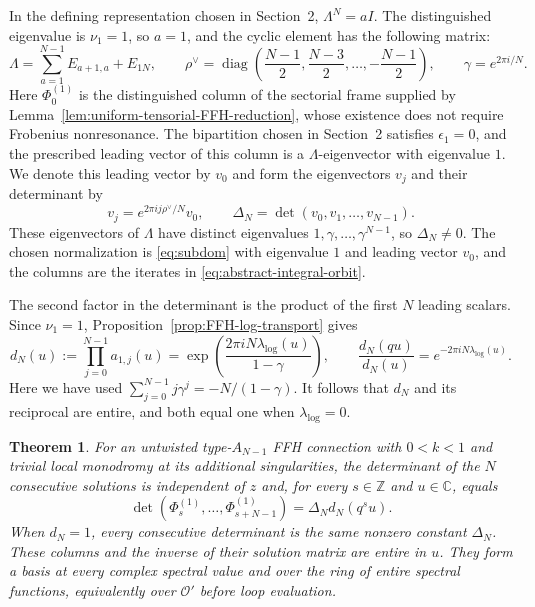 \documentclass[11pt,leqno]{amsart}
\numberwithin{equation}{section}
\theoremstyle{plain}
\newtheorem{theorem}{Theorem}[section]
\theoremstyle{definition}
\theoremstyle{plain}
\theoremstyle{definition}
\theoremstyle{remark}
\begin{document}
In the defining representation chosen in Section~2, $\Lambda^N=aI$.  The distinguished eigenvalue is $\nu_1=1$, so $a=1$, and the cyclic element has the following matrix:
\[
 \Lambda=\sum_{a=1}^{N-1}E_{a+1,a}+E_{1N},\qquad
 \rho^\vee=\operatorname{diag}\left(\frac{N-1}{2},\frac{N-3}{2},\ldots,-\frac{N-1}{2}\right),
 \qquad \gamma=e^{2\pi i/N}.
\]
Here $\Phi_0^{(1)}$ is the distinguished column of the sectorial frame supplied by Lemma~\ref{lem:uniform-tensorial-FFH-reduction}, whose existence does not require Frobenius nonresonance.  The bipartition chosen in Section~2 satisfies $\epsilon_1=0$, and the prescribed leading vector of this column is a $\Lambda$-eigenvector with eigenvalue $1$.  We denote this leading vector by $v_0$ and form the eigenvectors $v_j$ and their determinant by
\begin{equation}\label{eq:typeA-leading-volume}
 v_j=e^{2\pi i j\rho^\vee/N}v_0,\qquad
 \Delta_N=\det(v_0,v_1,\ldots,v_{N-1}).
\end{equation}
These eigenvectors of $\Lambda$ have distinct eigenvalues $1,\gamma,\ldots,\gamma^{N-1}$, so $\Delta_N\ne0$.  The chosen normalization is \eqref{eq:subdom} with eigenvalue $1$ and leading vector $v_0$, and the columns are the iterates in \eqref{eq:abstract-integral-orbit}.

The second factor in the determinant is the product of the first $N$ leading scalars.  Since $\nu_1=1$, Proposition~\ref{prop:FFH-log-transport} gives
\begin{equation}\label{eq:FFH-volume-multiplier}
 d_N(u):=\prod_{j=0}^{N-1}a_{1,j}(u)
 =\exp\!\left(\frac{2\pi iN\lambda_{\log}(u)}{1-\gamma}\right),
 \qquad
 \frac{d_N(qu)}{d_N(u)}
 =e^{-2\pi iN\lambda_{\log}(u)}.
\end{equation}
Here we have used $\sum_{j=0}^{N-1}j\gamma^j=-N/(1-\gamma)$.  It follows that $d_N$ and its reciprocal are entire, and both equal one when $\lambda_{\log}=0$.

\begin{theorem}\label{thm:FFH-typeA-cyclic-basis}
For an untwisted type-$A_{N-1}$ FFH connection with $0<k<1$ and trivial local monodromy at its additional singularities, the determinant of the $N$ consecutive solutions is independent of $z$ and, for every $s\in\mathbb Z$ and $u\in\mathbb C$, equals
\begin{equation}\label{eq:typeA-entire-cyclic-determinant}
 \det(\Phi_s^{(1)},\ldots,\Phi_{s+N-1}^{(1)})
 =\Delta_Nd_N(q^su).
\end{equation}
When $d_N=1$, every consecutive determinant is the same nonzero constant $\Delta_N$.  These columns and the inverse of their solution matrix are entire in $u$.  They form a basis at every complex spectral value and over the ring of entire spectral functions, equivalently over $\mathcal O'$ before loop evaluation.
\end{theorem}
\end{document}

